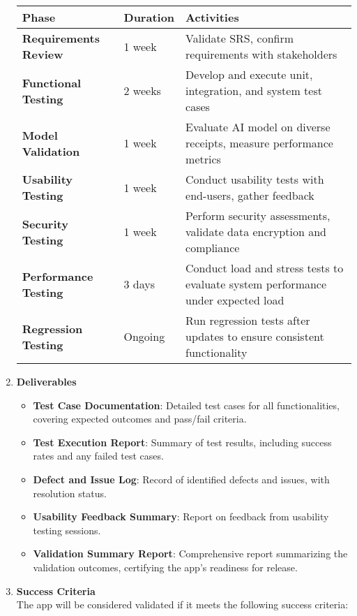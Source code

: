 \documentclass[12pt, titlepage]{article}
\begin{document}
\begin{enumerate}
	\noindent \begin{tabular}{|>{\raggedright\arraybackslash}p{3cm}|p{2cm}|>{\raggedright\arraybackslash}p{7cm}|}
		\hline
		\textbf{Phase} & \textbf{Duration} & \textbf{Activities} \\
		\hline
		\textbf{Requirements Review} & 1 week & Validate SRS, confirm requirements with stakeholders \\
		\hline
		\textbf{Functional Testing} & 2 weeks & Develop and execute unit, integration, and system test cases \\
		\hline
		\textbf{Model Validation} & 1 week & Evaluate AI model on diverse receipts, measure performance metrics \\
		\hline
		\textbf{Usability Testing} & 1 week & Conduct usability tests with end-users, gather feedback \\
		\hline
		\textbf{Security Testing} & 1 week & Perform security assessments, validate data encryption and compliance \\
		\hline
		\textbf{Performance Testing} & 3 days & Conduct load and stress tests to evaluate system performance under expected load \\
		\hline
		\textbf{Regression Testing} & Ongoing & Run regression tests after updates to ensure consistent functionality \\
		\hline
	\end{tabular}
	\newpage
	\item \textbf{Deliverables}
	\begin{itemize}
		\item \textbf{Test Case Documentation}: Detailed test cases for all functionalities, covering expected outcomes and pass/fail criteria.
		\item \textbf{Test Execution Report}: Summary of test results, including success rates and any failed test cases.
		\item \textbf{Defect and Issue Log}: Record of identified defects and issues, with resolution status.
		\item \textbf{Usability Feedback Summary}: Report on feedback from usability testing sessions.
		\item \textbf{Validation Summary Report}: Comprehensive report summarizing the validation outcomes, certifying the app's readiness for release.
	\end{itemize}
	\item \textbf{Success Criteria} \\
	The app will be considered validated if it meets the following success criteria:

\end{enumerate}
\end{document}
